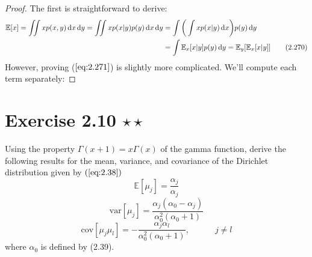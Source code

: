 \vspace{1em}

\begin{proof}
    The first is straightforward to derive:
    \begin{align*}
        \mathbb{E}[x] 
        = \iint x p(x, y) \mathop{}\!\mathrm{d} x \mathop{}\!\mathrm{d} y
        = \iint x p(x | y) p(y) \mathop{}\!\mathrm{d} x \mathop{}\!\mathrm{d} y
        &= \int\bigg(\int x p(x | y) \mathop{}\!\mathrm{d} x\bigg) p(y) \mathop{}\!\mathrm{d} y \\
        &= \int \mathbb{E}_x[x | y] p(y) \mathop{}\!\mathrm{d} y 
        = \mathbb{E}_y[\mathbb{E}_x[x | y]]
        \tag{2.270}
    \end{align*}
    However, proving ($\ref{eq:2.271}$) is slightly more complicated.
    We'll compute each term separately:
    
\end{proof}

\section*{Exercise 2.10 $\star \star$}
Using the property $\Gamma(x+1) = x\Gamma(x)$ of the gamma function,
derive the following results for the mean, variance, and covariance
of the Dirichlet distribution given by $(\ref{eq:2.38})$
\begin{equation}\label{eq:2.273}\tag{2.273}
    \mathbb{E}[\mu_j] = \frac{\alpha_j}{\alpha_j}
\end{equation}
\begin{equation}\label{eq:2.274}\tag{2.274}
    \text{var}[\mu_j] = \frac{\alpha_j(\alpha_0 - \alpha_j)}{\alpha_0^2(\alpha_0 + 1)}
\end{equation}
\begin{equation}\label{eq:2.275}\tag{2.275}
    \text{cov}[\mu_j\mu_l] = -\frac{\alpha_j\alpha_l}{\alpha_0^2(\alpha_0 + 1)},
    \hspace{3em} j \neq l
\end{equation}
where $\alpha_0$ is defined by  (2.39).

\vspace{1em}

